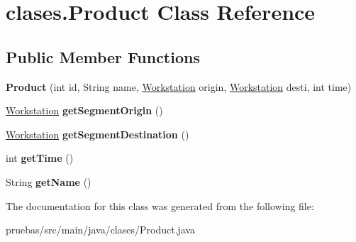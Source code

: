 \hypertarget{classclases_1_1_product}{}\section{clases.\+Product Class Reference}
\label{classclases_1_1_product}
\subsection*{Public Member Functions}
\begin{DoxyCompactItemize}
\item 
\mbox{\label{classclases_1_1_product_a57d72a4e60b93837e642ba36b5cf912b}} 
{\bfseries Product} (int id, String name, \mbox{\hyperlink{classclases_1_1_workstation}{Workstation}} origin, \mbox{\hyperlink{classclases_1_1_workstation}{Workstation}} desti, int time)
\item 
\mbox{\label{classclases_1_1_product_a6a97db66d1dbc50688a7ba745075e97f}} 
\mbox{\hyperlink{classclases_1_1_workstation}{Workstation}} {\bfseries get\+Segment\+Origin} ()
\item 
\mbox{\label{classclases_1_1_product_a004b9df7d32b1c5e71aa65a1763922af}} 
\mbox{\hyperlink{classclases_1_1_workstation}{Workstation}} {\bfseries get\+Segment\+Destination} ()
\item 
\mbox{\label{classclases_1_1_product_a3662b5c449fbdd04155eedf9785cb3e8}} 
int {\bfseries get\+Time} ()
\item 
\mbox{\label{classclases_1_1_product_ad6f4a1848a82e41dce97ef287e5a720f}} 
String {\bfseries get\+Name} ()
\end{DoxyCompactItemize}


The documentation for this class was generated from the following file\+:\begin{DoxyCompactItemize}
\item 
pruebas/src/main/java/clases/Product.\+java\end{DoxyCompactItemize}
